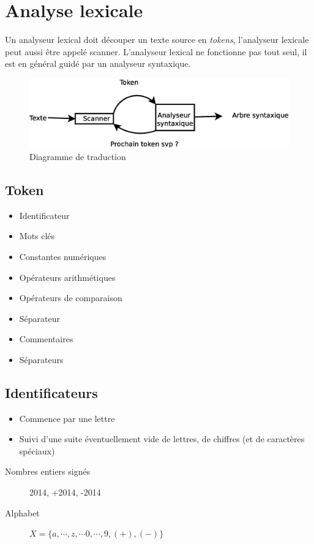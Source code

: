 \documentclass[12pt,a4paper,openany]{book}
\newcommand{\tokens}{\textit{tokens}}
\begin{document}
	\chapter{Analyse lexicale}
	Un analyseur lexical doit découper un texte source en \tokens, l'analyseur lexicale peut aussi être appelé scanner. L'analyseur lexical ne
	fonctionne pas tout seul, il est en général guidé par un analyseur syntaxique.
	\begin{figure}[H]
		\centering
		\includegraphics[width=12cm]{Diagramme4.eps}
		\caption{Diagramme de traduction}
	\end{figure}

	\section{Token}
	\begin{itemize}
		\item Identificateur
		\item Mots clés
		\item Constantes numériques
		\item Opérateurs arithmétiques
		\item Opérateurs de comparaison
		\item Séparateur
		\item Commentaires
		\item Séparateurs
	\end{itemize}
	\section{Identificateurs}
	\begin{itemize}
		\item Commence par une lettre
		\item Suivi d'une suite éventuellement vide de lettres, de chiffres (et de caractères spéciaux)
	\end{itemize}
	\begin{description}
		\item[Nombres entiers signés]2014, +2014, -2014
		\item[Alphabet] $X=\{a,\cdots,z,\cdots 0,\cdots,9,(+),(-)\}$
	\end{description}
\end{document}
